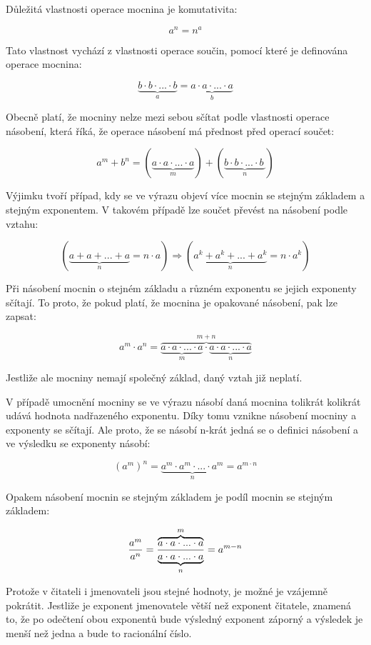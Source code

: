 
Důležitá vlastnosti operace mocnina je komutativita:

$$ a^n = n^a $$

Tato vlastnost vychází z vlastnosti operace součin, pomocí které je definována operace mocnina:

$$ \underbrace{b \cdot b \cdot ... \cdot b}_a = \underbrace{a \cdot a \cdot ... \cdot a}_b $$

Obecně platí, že mocniny nelze mezi sebou sčítat podle vlastnosti operace násobení, která říká, že  operace násobení má přednost před operací součet:

$$ a^m + b^n = (\underbrace{a\cdot a\cdot ... \cdot a}_m) + (\underbrace{b \cdot b \cdot ... \cdot b \ }_n)$$

Výjimku tvoří případ, kdy se ve výrazu objeví více mocnin se stejným základem a stejným exponentem. V takovém případě lze součet převést na násobení podle vztahu:

$$ (\underbrace{a + a + ... +a}_n = n \cdot a) \Rightarrow (\underbrace{a^k + a^k + ...+ a^k}_n = n\cdot a^k) $$

Při násobení mocnin o stejném základu a různém exponentu se jejich exponenty sčítají. To proto, že pokud platí, že mocnina je opakované násobení, pak lze zapsat:

$$ a^m \cdot a^n = \overbrace{\underbrace{a \cdot a \cdot ... \cdot a}_m \cdot \underbrace{a \cdot a \cdot ... \cdot a}_n}^{m+n} $$

Jestliže ale mocniny nemají společný základ, daný vztah již neplatí.

V případě umocnění mocniny se ve výrazu násobí daná mocnina tolikrát kolikrát udává hodnota nadřazeného exponentu. Díky tomu vznikne násobení mocniny a exponenty se sčítají. Ale proto, že se násobí n-krát jedná se o definici násobení a ve výsledku se exponenty násobí:

$$ (a^m)^n = \underbrace{a^m \cdot a^m \cdot ... \cdot a^m}_n = a^{m \cdot n} $$

Opakem násobení mocnin se stejným základem je podíl mocnin se stejným základem:

$$ {a^m \over a^n} = {\overbrace{a\cdot a \cdot ... \cdot a}^m \over \underbrace{a \cdot a \cdot ... \cdot a}_n } = {a^{m-n}} $$

Protože v čitateli i jmenovateli jsou stejné hodnoty, je možné je vzájemně pokrátit. Jestliže je exponent jmenovatele větší než exponent čitatele, znamená to, že po odečtení obou exponentů bude výsledný exponent záporný a výsledek je menší než jedna a bude to racionální číslo.


